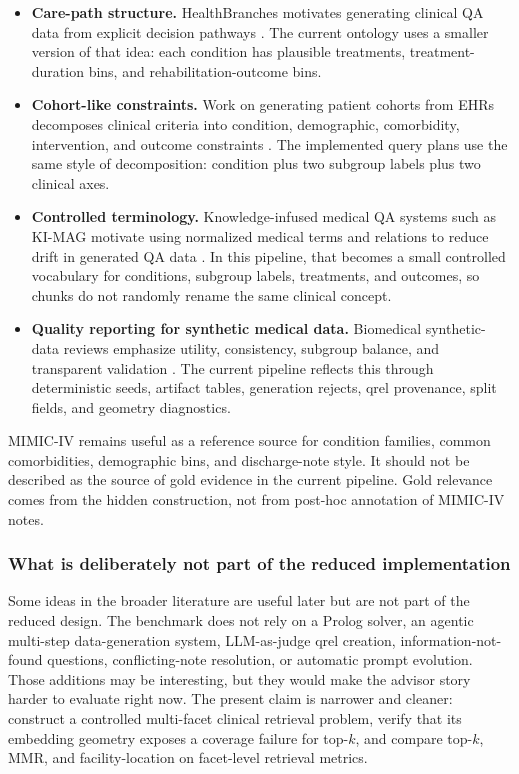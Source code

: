 \documentclass[11pt,a4paper]{article}
\begin{document}
\begin{itemize}[noitemsep, topsep=0pt]
	\item \textbf{Care-path structure.} HealthBranches motivates generating clinical QA data from explicit decision pathways \citep{cosentino2025healthbranches}. The current ontology uses a smaller version of that idea: each condition has plausible treatments, treatment-duration bins, and rehabilitation-outcome bins.
	\item \textbf{Cohort-like constraints.} Work on generating patient cohorts from EHRs decomposes clinical criteria into condition, demographic, comorbidity, intervention, and outcome constraints \citep{ziletti2025cohorts}. The implemented query plans use the same style of decomposition: condition plus two subgroup labels plus two clinical axes.
	\item \textbf{Controlled terminology.} Knowledge-infused medical QA systems such as KI-MAG motivate using normalized medical terms and relations to reduce drift in generated QA data \citep{zafar2024kimag}. In this pipeline, that becomes a small controlled vocabulary for conditions, subgroup labels, treatments, and outcomes, so chunks do not randomly rename the same clinical concept.
	\item \textbf{Quality reporting for synthetic medical data.} Biomedical synthetic-data reviews emphasize utility, consistency, subgroup balance, and transparent validation \citep{rao2026scoping,montenegro2025medicalsynthetic}. The current pipeline reflects this through deterministic seeds, artifact tables, generation rejects, qrel provenance, split fields, and geometry diagnostics.
\end{itemize}

MIMIC-IV remains useful as a reference source for condition families, common comorbidities, demographic bins, and discharge-note style. It should not be described as the source of gold evidence in the current pipeline. Gold relevance comes from the hidden construction, not from post-hoc annotation of MIMIC-IV notes.

\subsubsection{What is deliberately not part of the reduced implementation}

Some ideas in the broader literature are useful later but are not part of the reduced design. The benchmark does not rely on a Prolog solver, an agentic multi-step data-generation system, LLM-as-judge qrel creation, information-not-found questions, conflicting-note resolution, or automatic prompt evolution. Those additions may be interesting, but they would make the advisor story harder to evaluate right now. The present claim is narrower and cleaner: construct a controlled multi-facet clinical retrieval problem, verify that its embedding geometry exposes a coverage failure for top-$k$, and compare top-$k$, MMR, and facility-location on facet-level retrieval metrics.
\end{document}
